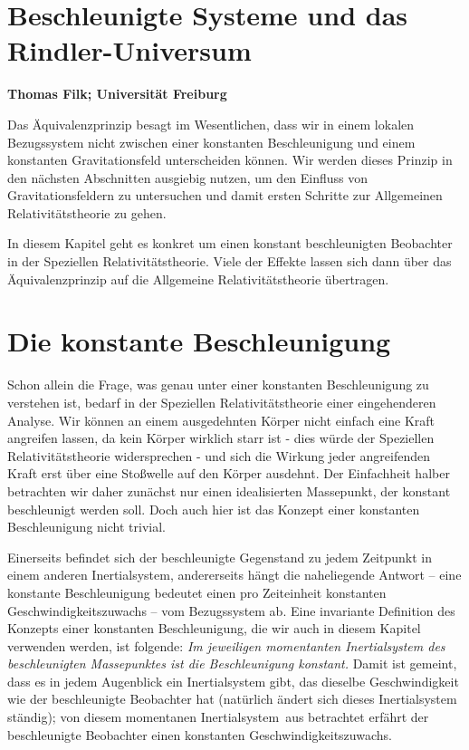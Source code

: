 
\setcounter{page}{1}
\setcounter{section}{0}
\setcounter{figure}{0}
\setcounter{equation}{0}
\setcounter{table}{0}
\setcounter{footnote}{0}

\section*{Beschleunigte Systeme und das Rindler-Universum}
\noindent
{\bf Thomas Filk; Universit\"at Freiburg}
\vspace{1cm}

\label{chap_Rindler}

\noindent
Das \"Aquivalenzprinzip besagt im Wesentlichen,
dass wir in einem lokalen Bezugssys\-tem nicht 
zwischen einer konstanten Beschleunigung 
und einem konstanten Gravitationsfeld 
unterscheiden k\"onnen. Wir werden
dieses Prinzip in den n\"achsten Abschnitten 
ausgiebig nutzen, um den Einfluss von
Gravitationsfeldern zu untersuchen und damit
ersten Schritte zur Allgemeinen Relativit\"atstheorie
zu gehen.

In diesem Kapitel geht es konkret um 
einen konstant
beschleunigten Beobachter in der Speziellen
Relativit\"atstheorie. Viele der Effekte
lassen sich dann \"uber das \"Aquivalenzprinzip
auf die Allgemeine Relativit\"atstheorie
\"ubertragen.

\section{Die konstante Beschleunigung}

Schon allein die Frage,  was genau unter einer
konstanten Beschleunigung zu verstehen ist, bedarf
in der Speziellen Relativit\"atstheorie einer 
eingehenderen Analyse. Wir k\"onnen an einem
ausgedehnten K\"orper nicht einfach eine
Kraft angreifen lassen, da kein K\"orper wirklich
starr ist - dies w\"urde der Speziellen Relativit\"atstheorie
widersprechen - und sich die Wirkung jeder
angreifenden Kraft erst \"uber eine Sto\ss welle
auf den K\"orper ausdehnt. Der Einfachheit
halber betrachten wir daher zun\"achst nur
einen idealisierten Massepunkt, der
konstant beschleunigt werden soll. Doch auch
hier ist das Konzept einer konstanten
Beschleunigung nicht trivial.

Einerseits befindet sich der 
beschleunigte Gegenstand zu jedem Zeitpunkt in 
einem anderen Inertialsystem, andererseits
h\"angt die naheliegende Antwort --
eine konstante Beschleunigung bedeutet einen pro 
Zeiteinheit konstanten Geschwindigkeitszuwachs --
vom Bezugssystem ab. Eine invariante Definition
des Konzepts einer konstanten Beschleunigung,
die wir auch in diesem Kapitel verwenden 
werden, ist folgende: 
{\em Im jeweiligen momentanten Inertialsystem
des beschleunigten Massepunktes ist die 
Beschleunigung konstant.} Damit ist gemeint,
dass es in jedem Augenblick ein Inertialsystem
gibt, das dieselbe Geschwindigkeit wie der
beschleunigte Beobachter hat (nat\"urlich 
\"andert sich dieses Inertialsystem st\"andig); 
von diesem \glqq momentanen Inertialsystem\grqq\
aus betrachtet erf\"ahrt der beschleunigte 
Beobachter einen konstanten Geschwindigkeitszuwachs.

